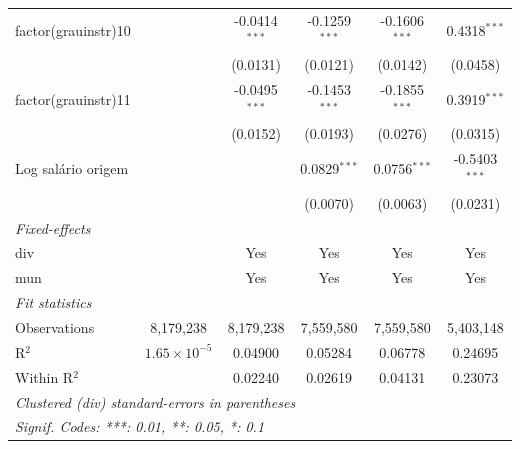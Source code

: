 \begin{tabular}{lccccc}
   factor(grauinstr)10      &                       & -0.0414$^{***}$        & -0.1259$^{***}$         & -0.1606$^{***}$         & 0.4318$^{***}$\\   
                            &                       & (0.0131)               & (0.0121)                & (0.0142)                & (0.0458)\\   
   factor(grauinstr)11      &                       & -0.0495$^{***}$        & -0.1453$^{***}$         & -0.1855$^{***}$         & 0.3919$^{***}$\\   
                            &                       & (0.0152)               & (0.0193)                & (0.0276)                & (0.0315)\\   
   Log salário origem       &                       &                        & 0.0829$^{***}$          & 0.0756$^{***}$          & -0.5403$^{***}$\\   
                            &                       &                        & (0.0070)                & (0.0063)                & (0.0231)\\   
   \midrule
   \emph{Fixed-effects}\\
   div                      &                       & Yes                    & Yes                     & Yes                     & Yes\\  
   mun                      &                       & Yes                    & Yes                     & Yes                     & Yes\\  
   \midrule
   \emph{Fit statistics}\\
   Observations             & 8,179,238             & 8,179,238              & 7,559,580               & 7,559,580               & 5,403,148\\  
   R$^2$                    & $1.65\times 10^{-5}$  & 0.04900                & 0.05284                 & 0.06778                 & 0.24695\\  
   Within R$^2$             &                       & 0.02240                & 0.02619                 & 0.04131                 & 0.23073\\  
   \midrule \midrule
   \multicolumn{6}{l}{\emph{Clustered (div) standard-errors in parentheses}}\\
   \multicolumn{6}{l}{\emph{Signif. Codes: ***: 0.01, **: 0.05, *: 0.1}}\\
\end{tabular}
\par\endgroup


